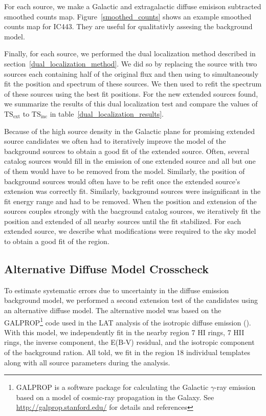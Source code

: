 \documentclass[12pt,preprint]{aastex}
\newcommand{\tsext}{{\ensuremath{\text{TS}_\text{ext}}}\xspace}
\newcommand{\tsinc}{\ensuremath{\text{TS}_\text{inc}}\xspace}
\newcommand{\pointlike}{\text{\em pointlike}\xspace}
\newcommand{\gtlike}{\text{\em gtlike}\xspace}
\begin{document}
For each source, we make a Galactic and extragalactic diffuse emisison
subtracted smoothed counts map. Figure~\ref{smoothed_counts} shows an
example smoothed counts map for IC443. They are useful for qualitativly
assesing the background model.

Finally, for each source, we performed the dual localization method
described in section~\ref{dual_localization_method}.  We did so by
replacing the source with two sources each containing half of the original
flux and then using \pointlike to simultaneously fit the position and
spectrum of these sources.  We then used \gtlike to refit the spectrum of
these sources using the best fit positions. For the new extended sources
found, we summarize the results of this dual localization test and compare
the values of \tsext to \tsinc in table~\ref{dual_localization_results}.

Because of the high source density in the Galactic plane for promising
extended source candidates we often had to iteratively improve the model
of the background sources to obtain a good fit of the extended source.
Often, several catalog sources would fill in the emission of one
extended source and all but one of them would have to be removed from
the model. Similarly, the position of background sources would often
have to be refit once the extended source's extension was correctly
fit. Similarly, background sources were insignificant in the fit
energy range and had to be removed.  When the position and extension
of the sources couples strongly with the bacground catalog sources, we
iteratively fit the position and extended of all nearby sources until the
fit stabilized.  For each extended source, we describe what modifications
were required to the sky model to obtain a good fit of the region.

\subsection{Alternative Diffuse Model Crosscheck}
\label{alt_diff_model_description}

To estimate systematic errors due to uncertainty in the diffuse
emission background model, we performed a second
extension test of the candidates using
an alternative diffuse
model. The alternative model was based on the GALPROP\footnote{GALPROP
is a software package for calculating the Galactic $\gamma$-ray
emission based on a model of cosmic-ray propagation in the Galaxy. See
\url{http://galprop.stanford.edu/} for details and references} code
used in the LAT analysis of the isotropic diffuse emission
(\cite{isotropic_lat}).  
With this model,
we independently fit in the nearby region 
7 HI rings, 7 HII rings, the inverse component,
the E(B-V) residual, and the isotropic component of
the background ration.
All told, we fit in the region 18 individual templates along
with all source parameters during the analysis.
\end{document}
